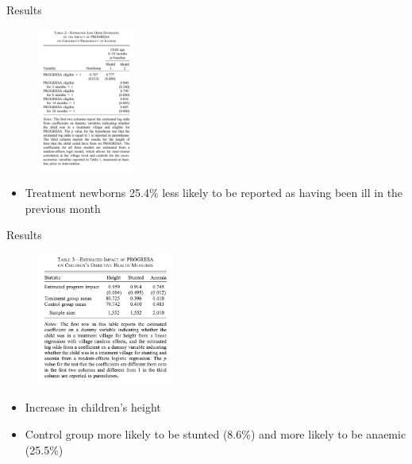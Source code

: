 \documentclass[11pt,notes=hide,aspectratio=169,mathserif]{beamer}
\begin{document}
\begin{frame}{Results}
\begin{figure}
\centering
\includegraphics[width=0.28\textwidth]{inputs/table2.png}
\end{figure}
\begin{itemize}
\item Treatment newborns 25.4\% less likely to be reported as having been ill in the previous month
\end{itemize}
\end{frame}

\begin{frame}{Results}
\begin{figure}
\centering
\includegraphics[width=0.4\textwidth]{inputs/table3.png}
\end{figure}
\begin{itemize}
\item Increase in children's height 
\item Control group more likely to be stunted (8.6\%) and more likely to be anaemic (25.5\%)
\end{itemize}
\end{frame}
\end{document}
